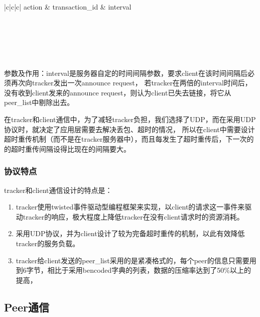 \documentclass[15pt]{ctexart}
\begin{document}
			\begin{table}[H]
				\centering
				\begin{tabular}{|c|c|c|}
					\hline
					action & transaction\_id & interval \\
					\hline
					\\
					\\
					\\
					\\
					\\
					\hline
				\end{tabular}
				\caption{服务器announce response}
			\end{table}
			\par 参数及作用：interval是服务器自定的时间间隔参数，要求client在该时间间隔后必须再次向tracker发出一次announce request，
			若tracker在两倍的interval时间后，没有收到client发来的announce request，则认为client已失去链接，将它从peer\_list中剔除出去。
			\\
			\par 在tracker和client通信中，为了减轻tracker负担，我们选择了UDP，而在采用UDP协议时，就决定了应用层需要去解决丢包、超时的情况，
			所以在client中需要设计超时重传机制（而不是在tracker服务器中），而且每发生了超时重传后，下一次的的超时重传间隔设得比现在的间隔要大。
		\subsubsection{协议特点} %
		\label{ssub:协议特点}
			tracker和client通信设计的特点是：
			\begin{enumerate}
				\item tracker使用twisted事件驱动型编程框架来实现，以client的请求这一事件来驱动tracker的响应，极大程度上降低tracker在没有client请求时的资源消耗。
				\item 采用UDP协议，并为client设计了较为完备超时重传的机制，以此有效降低tracker的服务负载。
				\item tracker给client发送的peer\_list采用的是紧凑格式的，每个peer的信息只需要用到6字节，相比于采用bencoded字典的列表，数据的压缩率达到了50\%以上的提高，			
			\end{enumerate}		
	\subsection{Peer通信} %
	\label{sub:peer通信}
\end{document}
